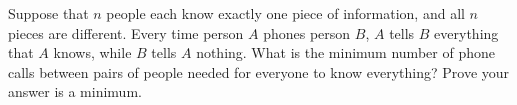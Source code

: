 Suppose that $n$ people each know exactly one piece of information, and all $n$ pieces are different. Every time person $A$ phones person $B$,  $A$ tells $B$ everything that $A$ knows, while $B$ tells $A$ nothing. What is the minimum number of phone calls between pairs of people needed for everyone to know everything? Prove your answer is a minimum.